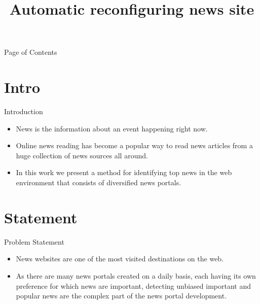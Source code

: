 \documentclass{beamer}
\title{Automatic reconfiguring news site}
\begin{document}
	\begin{frame}{Page of Contents}
		\tableofcontents
	\end{frame}
	\section{Intro}
	\begin{frame}{Introduction}
		\begin{itemize}
			\item \Large{News is the information about an event happening right
			now.}
			\item Online news reading has become a popular way to read news articles from a huge collection of news sources all around.
			\item In this work we present a method for identifying top news in the web environment that consists of diversiﬁed news portals. 
		\end{itemize}
	\end{frame}
	\section{Statement}
	\begin{frame}{Problem Statement}
	    \begin{itemize}
	        \item  \Large{News websites are one of the most visited destinations on the web.}
	        \item \Large { As there are many news portals created on a daily basis, each having its own preference for which news are important, detecting unbiased important and popular news are the complex part of the news portal development.}
	    \end{itemize}
	\end{frame}
\end{document}
